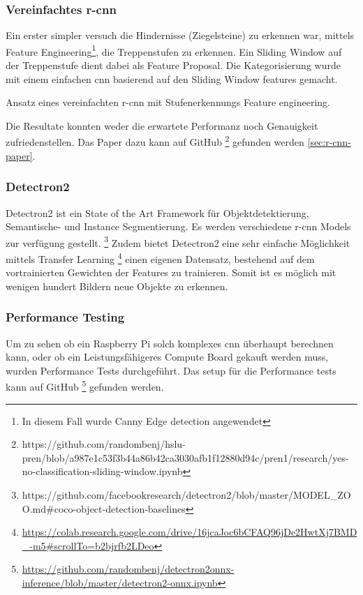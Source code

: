 \subsubsection{Vereinfachtes \acrshort{r-cnn}}

Ein erster simpler versuch die Hindernisse (Ziegelsteine) zu erkennen war, mittels Feature Engineering\footnote{
In diesem Fall wurde Canny Edge detection \cite{canny-edge-detection} angewendet}, die Treppenstufen zu
erkennen. Ein Sliding Window auf der Treppenstufe dient dabei als Feature Proposal.
Die Kategorisierung wurde mit einem einfachen \acrshort{cnn} basierend auf den Sliding Window features 
gemacht.

{
Ansatz eines vereinfachten \acrshort{r-cnn} mit Stufenerkennungs Feature engineering.
}

Die Resultate konnten weder die erwartete Performanz noch Genauigkeit zufriedenstellen.
Das Paper dazu kann auf GitHub \footnote{
https://github.com/randombenj/hslu-pren/blob/a987e1c53f3b44a86b42ca3030afb1f12880d94c/pren1/research/yes-no-classification-sliding-window.ipynb} gefunden werden \ref{sec:r-cnn-paper}.


\subsubsection{Detectron2}

Detectron2 \cite{wu2019detectron2} ist ein State of the Art Framework für Objektdetektierung, Semantische- und Instance Segmentierung.
Es werden verschiedene \acrshort{r-cnn} Models zur verfügung gestellt. \footnote{
https://github.com/facebookresearch/detectron2/blob/master/MODEL\_ZOO.md\#coco-object-detection-baselines
}
Zudem bietet Detectron2 eine sehr einfache Möglichkeit mittels Transfer Learning \footnote{\url{https://colab.research.google.com/drive/16jcaJoc6bCFAQ96jDe2HwtXj7BMD_-m5#scrollTo=b2bjrfb2LDeo}}
einen eigenen Datensatz, bestehend auf dem vortrainierten Gewichten der Features zu trainieren.
Somit ist es möglich mit wenigen hundert Bildern neue Objekte zu erkennen.

\subsubsection{Performance Testing}

Um zu sehen ob ein Raspberry Pi solch komplexes \acrshort{cnn} überhaupt berechnen kann, oder ob ein
Leistungsfähigeres Compute Board gekauft werden muss, wurden Performance Tests durchgeführt.
Das setup für die Performance tests kann auf GitHub \footnote{\url{https://github.com/randombenj/detectron2onnx-inference/blob/master/detectron2-onnx.ipynb}} gefunden werden.

